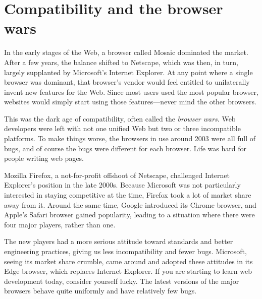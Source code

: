 \section{Compatibility and the browser wars}

In the early stages of the Web, a browser called Mosaic dominated the market. After a few years, the balance shifted to Netscape, which was then, in turn, largely supplanted by Microsoft's Internet Explorer. At any point where a single browser was dominant, that browser's vendor would feel entitled to unilaterally invent new features for the Web. Since most users used the most popular browser, websites would simply start using those features—never mind the other browsers.

This was the dark age of compatibility, often called the \emph{browser wars}. Web developers were left with not one unified Web but two or three incompatible platforms. To make things worse, the browsers in use around 2003 were all full of bugs, and of course the bugs were different for each browser. Life was hard for people writing web pages.

Mozilla Firefox, a not-for-profit offshoot of Netscape, challenged Internet Explorer's position in the late 2000s. Because Microsoft was not particularly interested in staying competitive at the time, Firefox took a lot of market share away from it. Around the same time, Google introduced its Chrome browser, and Apple's Safari browser gained popularity, leading to a situation where there were four major players, rather than one.

The new players had a more serious attitude toward standards and better engineering practices, giving us less incompatibility and fewer bugs. Microsoft, seeing its market share crumble, came around and adopted these attitudes in its Edge browser, which replaces Internet Explorer. If you are starting to learn web development today, consider yourself lucky. The latest versions of the major browsers behave quite uniformly and have relatively few bugs.
